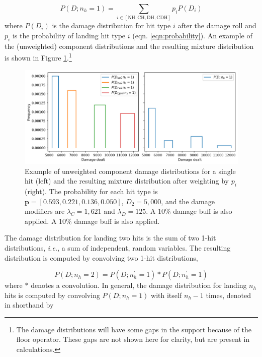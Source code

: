 \documentclass{article}
\begin{document}
    \begin{equation}
        P(D; n_h = 1) = \sum_{i \in [\textrm{NH}, \textrm{CH}, \textrm{DH}, \textrm{CDH}]} p_i P(D_i) 
    \end{equation}
    where $P(D_i)$ is the damage distribution for hit type $i$ after the damage roll and $p_i$ is the probability of landing hit type $i$ (eqn. \ref{eqn:probability}). An example of the (unweighted) component distributions and the resulting mixture distribution is shown in Figure \ref{fig:1-hit-mixture}.\footnote{The damage distributions will have some gaps in the support because of the floor operator. These gaps are not shown here for clarity, but are present in calculations.}
    \begin{figure}[H]
        \centering
        \includegraphics[width=0.95\linewidth]{img/mixture-distribution.png}
        \caption{Example of unweighted component damage distributions for a single hit (left) and the resulting mixture distribution after weighting by $p_i$ (right). The probability for each hit type is $\textbf{p} = [0.593, 0.221, 0.136, 0.050]$, $D_2 = 5,000$, and the damage modifiers are $\lambda_C = 1,621$ and $\lambda_D = 125$. A 10\% damage buff is also applied. A 10\% damage buff is also applied.}\label{fig:1-hit-mixture}
    \end{figure}

    The damage distribution for landing two hits is the sum of two 1-hit distributions, \textit{i.e.}, a sum of independent, random variables. The resulting distribution is computed by convolving two 1-hit distributions, 
    
    \begin{equation}
        P(D; n_h = 2) = P(D; n_h^\prime = 1) \ast P(D; n_h^\prime = 1)
    \end{equation}
    where $\ast$ denotes a convolution. In general, the damage distribution for landing $n_h$ hits is computed by convolving $P(D; n_h = 1)$ with itself $n_h - 1$ times, denoted in shorthand by
    
\end{document}
